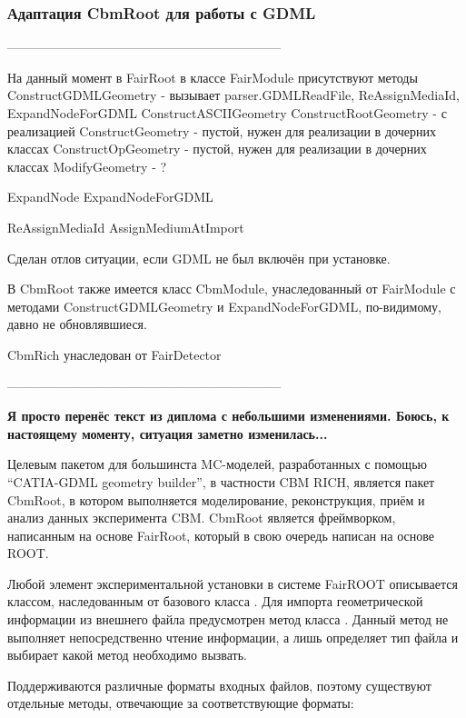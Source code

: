 \subsubsection{Адаптация CbmRoot для работы с GDML}\label{sec:secFairModule}

\todo -----------------------------------------------------------------

На данный момент в FairRoot в классе FairModule присутствуют методы
ConstructGDMLGeometry - вызывает parser.GDMLReadFile, ReAssignMediaId, ExpandNodeForGDML
ConstructASCIIGeometry
ConstructRootGeometry - с реализацией
ConstructGeometry - пустой, нужен для реализации в дочерних классах
ConstructOpGeometry - пустой, нужен для реализации в дочерних классах
ModifyGeometry - ? 

ExpandNode
ExpandNodeForGDML

ReAssignMediaId
AssignMediumAtImport

Сделан отлов ситуации, если GDML не был включён при установке.

В CbmRoot также имеется класс CbmModule, унаследованный от FairModule с методами ConstructGDMLGeometry и ExpandNodeForGDML, по-видимому, давно не обновлявшиеся.

CbmRich унаследован от FairDetector

\todo -----------------------------------------------------------------

\textbf{Я просто перенёс текст из диплома с небольшими изменениями. Боюсь, к настоящему моменту, ситуация заметно изменилась...}

Целевым пакетом для большинста MC-моделей, разработанных с помощью ``CATIA-GDML geometry builder'', в частности CBM RICH, является пакет CbmRoot, в котором выполняется моделирование, реконструкция, приём и анализ данных эксперимента CBM. CbmRoot является фреймворком, написанным на основе FairRoot, который в свою очередь написан на основе ROOT.

Любой элемент экспериментальной установки в системе FairROOT описывается классом, наследованным от базового класса . Для импорта геометрической информации из внешнего файла предусмотрен метод  класса . Данный метод не выполняет непосредственно чтение информации, а лишь определяет тип файла и выбирает какой метод необходимо вызвать.

Поддерживаются различные форматы входных файлов, поэтому существуют отдельные методы, отвечающие за соответствующие форматы:

